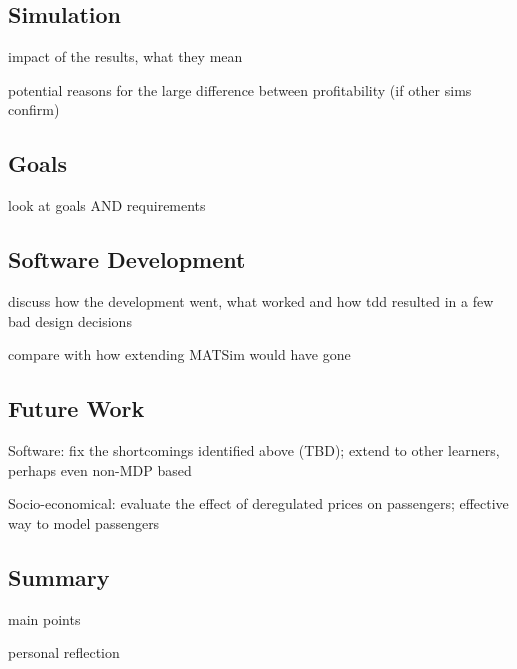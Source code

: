 \subsection{Simulation}

impact of the results, what they mean

potential reasons for the large difference between profitability (if other sims
confirm)


\subsection{Goals}

look at goals AND requirements


\subsection{Software Development}

discuss how the development went, what worked and how tdd resulted in a few bad
design decisions

compare with how extending MATSim would have gone


\subsection{Future Work}

Software: fix the shortcomings identified above (TBD); extend to other
learners, perhaps even non-MDP based

Socio-economical: evaluate the effect of deregulated prices on
passengers; effective way to model passengers


\subsection{Summary}

main points

personal reflection
